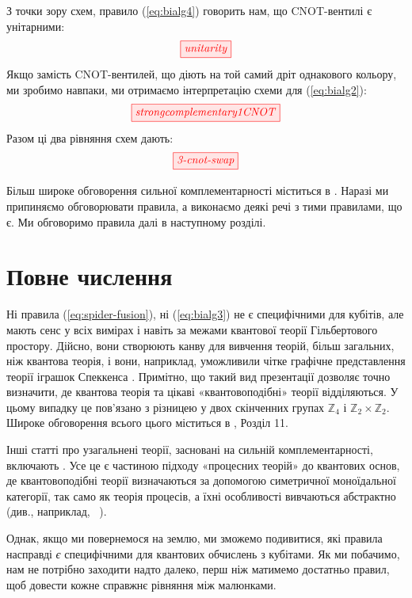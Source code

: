 \documentclass[11pt]{article}
\theoremstyle{definition}
\begin{document}
З точки зору схем, правило (\ref{eq:bialg4}) говорить нам, що CNOT-вентилі є унітарними:
\[ 
\tikzfig{unitarity}
\]
Якщо замість CNOT-вентилей, що діють на той самий дріт однакового кольору, ми зробимо навпаки, ми отримаємо інтерпретацію схеми для (\ref{eq:bialg2}):
\[ 
\tikzfig{strongcomplementary1CNOT}
\] 
Разом ці два рівняння схем дають:
\[ 
\tikzfig{3-cnot-swap}   
\] 

Більш широке обговорення сильної комплементарності міститься в \cite{CKbook}. Наразі ми припиняємо обговорювати правила, а виконаємо деякі речі з тими правилами, що є. Ми обговоримо правила далі в наступному розділі.

\section{Повне числення}\label{sec:compl}%

Ні правила (\ref{eq:spider-fusion}), ні (\ref{eq:bialg3}) не є специфічними для кубітів, але мають сенс у всіх вимірах і навіть за межами квантової теорії Гільбертового простору. Дійсно, вони створюють канву для вивчення теорій, більш загальних, ніж квантова теорія, і вони, наприклад, уможливили чітке графічне представлення теорії іграшок Спеккенса \cite{CEToy, CES, MiriamSpek}. Примітно, що такий вид презентації дозволяє точно визначити, де квантова теорія та цікаві «квантовоподібні» теорії відділяються. У цьому випадку це пов’язано з різницею у двох скінченних групах $\mathbb{Z}_4$ і $\mathbb{Z}_2\times\mathbb{Z}_2$. Широке обговорення всього цього міститься в \cite{CKbook}, Розділ 11.

Інші статті про узагальнені теорії, засновані на сильній комплементарності, включають \cite{CDKZ, gogioso2015schroedinger, gogioso2015fourier, CDKZ2, gogioso2019diagrammatic, gogioso2019generalised}. Усе це є частиною підходу «процесних теорій» до квантових основ, де квантовоподібні теорії визначаються за допомогою симетричної моноїдальної категорії, так само як теорія процесів, а їхні особливості вивчаються абстрактно (див., наприклад, ~\cite{JTF, selby2017leaks, gogioso2018categorical, gogioso2018density, selby2018reconstructing, lee2018no,coecke2016terminality, kissinger2017categorical, pinzani2019categorical, pinzani2020giving}).

Однак, якщо ми повернемося на землю, ми зможемо подивитися, які правила насправді \textit{є} специфічними для квантових обчислень з кубітами. Як ми побачимо, нам не потрібно заходити надто далеко, перш ніж матимемо достатньо правил, щоб довести кожне справжнє рівняння між малюнками.
\end{document}
